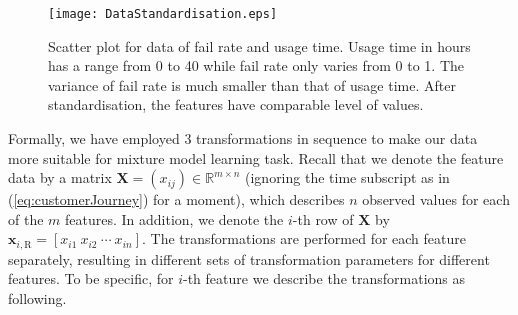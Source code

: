 \begin{figure}[!h]
\centering
\vspace*{-0.2cm}
\texttt{[image: DataStandardisation.eps]}
\caption{Scatter plot for data of fail rate and usage time. Usage time in hours has a range from 0 to 40 while fail rate only varies from 0 to 1. The variance of fail rate is much smaller than that of usage time. After standardisation, the features have comparable level of values.}
\label{fig:dataStandardisation}
\end{figure}

Formally, we have employed 3 transformations in sequence to make our data more suitable for mixture model learning task. Recall that we denote the feature data by a matrix $\mathbf{X} = (x_{ij}) \in \mathbb{R}^{m \times n}$ (ignoring the time subscript as in (\ref{eq:customerJourney}) for a moment), which describes $n$ observed values for each of the $m$ features. In addition, we denote the $i$-th row of $\mathbf{X}$ by $\mathbf{x}_{i,\text{R}} = [x_{i1} ~x_{i2} ~\cdots ~x_{in}]$. The transformations are performed for each feature separately, resulting in different sets of transformation parameters for different features. To be specific, for $i$-th feature we describe the transformations as following.

